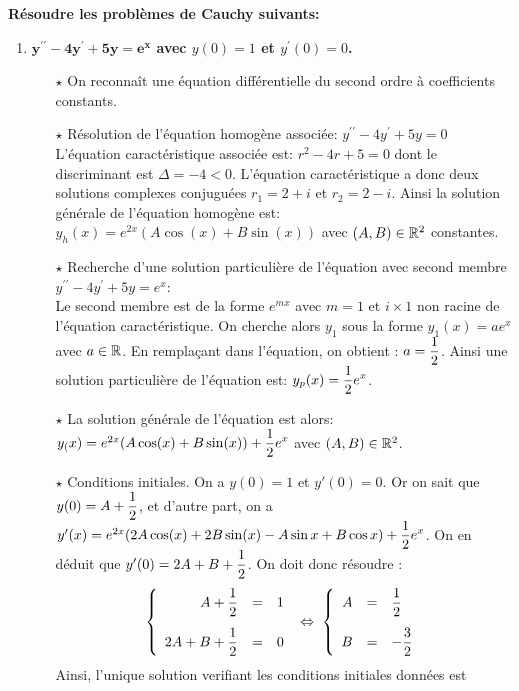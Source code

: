 \documentclass[a4paper, 11pt,reqno]{article}
\begin{document}
\begin{correction}  \;
  \textbf{R\'esoudre les probl\`emes de Cauchy suivants:}
  \begin{enumerate}
    \item \textbf{$\mathbf{y^{\prime\prime}-4y^{\prime}+5y=e^x}$ avec $y(0)=1$ et $y^{\prime}(0)=0$.}\\
          \begin{itemize}
            \item[$\star$] On reconna\^{i}t une \'equation diff\'erentielle du second ordre \`{a} coefficients constants.
            \item[$\star$] R\'esolution de l'\'equation homog\`{e}ne associ\'ee: $y^{\prime\prime}-4y^{\prime}+5y=0$\\
                  \noindent L'\'equation caract\'eristique associ\'ee est: $r^2-4r+5=0$ dont le discriminant est $\Delta=-4<0$. L'\'equation caract\'eristique a donc deux solutions complexes conjugu\'ees $r_1=2+i$ et $r_2=2-i$. Ainsi la solution g\'en\'erale de l'\'equation homog\`{e}ne est: $y_h(x) = e^{2x}(A \cos(x) + B \sin(x))$ avec $(A,B)\in\mathbb{R}^2$ constantes.
            \item[$\star$] Recherche d'une solution particuli\`{e}re de l'\'equation avec second membre $y^{\prime\prime}-4y^{\prime}+5y=e^x$:\\
                  \noindent Le second membre est de la forme $e^{mx}$ avec $m=1$ et $i\times 1$ non racine de l'\'equation caract\'eristique. On cherche alors $y_1$ sous la forme $y_1(x)=a e^{x}$ avec $a \in \mathbb{R}$. En rempla\c cant dans l'\'equation, on obtient : $a=\displaystyle \frac{1}{2}$. Ainsi une solution particuli\`{e}re de l'\'equation est: $y_p(x)= \displaystyle \frac{1}{2} e^x$.
            \item[$\star$] La solution g\'en\'erale de l'\'equation est alors: $y_(x) = e^{2x}(A \cos(x) + B \sin(x)) + \displaystyle \frac{1}{2} e^x$ avec $(A,B)\in\mathbb{R}^2$.
            \item[$\star$] Conditions initiales. On a $y(0)=1$ et $y'(0)=0$. Or on sait que $y(0)=A+\displaystyle\frac{1}{2}$, et d'autre part, on a $y'(x)=e^{2x}(2A \cos(x) + 2B \sin(x)-A\sin x +B \cos x) +\displaystyle \frac{1}{2}e^x$. On en d\'eduit que $y'(0)=2A+B+\displaystyle \frac{1}{2}$. On doit donc r\'esoudre :
                  $$\left\{ \begin{array}{rcl}
                      A+\ddp\frac{1}{2}     & = & 1\vsec \\
                      2A+B+\ddp \frac{1}{2} & = & 0
                    \end{array} \right. \; \Leftrightarrow \;
                    \left\{ \begin{array}{rcl}
                      A & = & \ddp \frac{1}{2} \vsec \\
                      B & = & \ddp -\frac{3}{2}
                    \end{array} \right.$$
                  Ainsi, l'unique solution v\?erifiant les conditions initiales donn\'ees est


\end{itemize}
\end{enumerate}
\end{correction}
\end{document}

